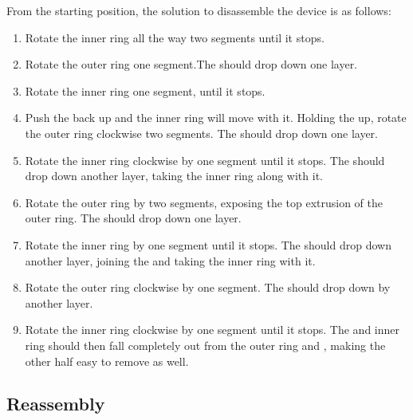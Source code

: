 \documentclass{article}
\begin{document}
From the starting position, the solution to disassemble the device is as follows:
\begin{enumerate}
      \item Rotate the inner ring all the way \cc{} two segments until it stops.
      \item Rotate the outer ring \cc{} one segment.The \hhalf{} should drop down one layer.
      \item Rotate the inner ring \cc{} one segment, until it stops.
      \item Push the \hhalf{} back up and the inner ring will move with it.
            Holding the \hhalf{} up, rotate the outer ring clockwise two segments.
            The \vhalf{} should drop down one layer.
      \item Rotate the inner ring clockwise by one segment until it stops.
            The \vhalf{} should drop down another layer, taking the inner ring along with it.
      \item Rotate the outer ring \cc{} by two segments, exposing the top extrusion of the outer ring.
            The \hhalf{} should drop down one layer.
      \item Rotate the inner ring \cc{} by one segment until it stops.
            The \hhalf{} should drop down another layer, joining the \vhalf{} and taking the inner ring with it.
      \item Rotate the outer ring clockwise by one segment.
            The \vhalf{} should drop down by another layer.
      \item Rotate the inner ring clockwise by one segment until it stops.
            The \vhalf{} and inner ring should then fall completely out from the outer ring and \hhalf{}, making the other half easy to remove as well.
\end{enumerate}

\subsection{Reassembly}
\end{document}

